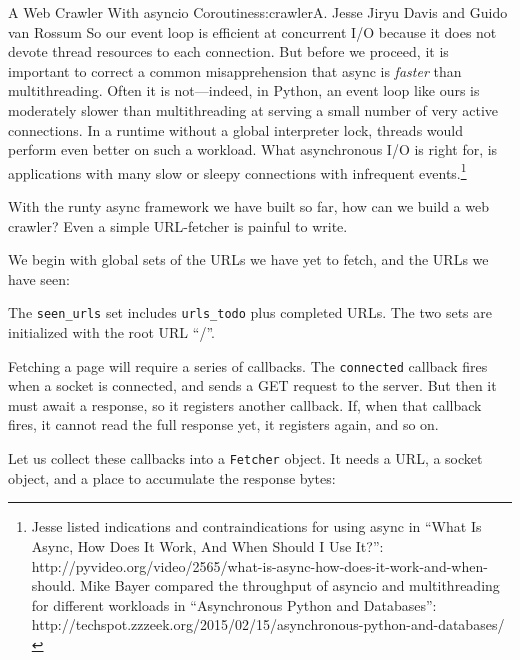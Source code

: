 \begin{aosachapter}{A Web Crawler With asyncio Coroutines}{s:crawler}{A. Jesse Jiryu Davis and Guido van Rossum}
So our event loop is efficient at concurrent I/O because it does not
devote thread resources to each connection. But before we proceed, it is
important to correct a common misapprehension that async is
\emph{faster} than multithreading. Often it is not---indeed, in Python,
an event loop like ours is moderately slower than multithreading at
serving a small number of very active connections. In a runtime without
a global interpreter lock, threads would perform even better on such a
workload. What asynchronous I/O is right for, is applications with many
slow or sleepy connections with infrequent events.\footnote{Jesse listed
  indications and contraindications for using async in ``What Is Async,
  How Does It Work, And When Should I Use It?'':
  http://pyvideo.org/video/2565/what-is-async-how-does-it-work-and-when-should.
  Mike Bayer compared the throughput of asyncio and multithreading for
  different workloads in ``Asynchronous Python and Databases'':
  http://techspot.zzzeek.org/2015/02/15/asynchronous-python-and-databases/}

\label{programming-with-callbacks}

With the runty async framework we have built so far, how can we build a
web crawler? Even a simple URL-fetcher is painful to write.

We begin with global sets of the URLs we have yet to fetch, and the URLs
we have seen:

\begin{Shaded}
\begin{Highlighting}[]
\NormalTok{([}\NormalTok{])}
\NormalTok{([}\NormalTok{])}
\end{Highlighting}
\end{Shaded}

The \texttt{seen\_urls} set includes \texttt{urls\_todo} plus completed
URLs. The two sets are initialized with the root URL ``/''.

Fetching a page will require a series of callbacks. The
\texttt{connected} callback fires when a socket is connected, and sends
a GET request to the server. But then it must await a response, so it
registers another callback. If, when that callback fires, it cannot read
the full response yet, it registers again, and so on.

Let us collect these callbacks into a \texttt{Fetcher} object. It needs
a URL, a socket object, and a place to accumulate the response bytes:


\end{aosachapter}

